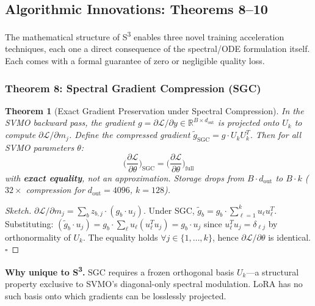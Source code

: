 \documentclass[conference]{IEEEtran}
\newtheorem{theorem}{Theorem}[section]
\newcommand{\RR}{\mathbb{R}}
\begin{document}
\subsection{Algorithmic Innovations: Theorems 8--10}

The mathematical structure of S\textsuperscript{3} enables three novel training acceleration techniques, each one a direct consequence of the spectral/ODE formulation itself. Each comes with a formal guarantee of zero or negligible quality loss.

\subsubsection{Theorem 8: Spectral Gradient Compression (SGC)}

\begin{theorem}[Exact Gradient Preservation under Spectral Compression]
\label{thm:sgc}
In the SVMO backward pass, the gradient $g = \partial\mathcal{L}/\partial y \in \RR^{B \times d_{\text{out}}}$ is projected onto $U_k$ to compute $\partial\mathcal{L}/\partial m_j$. Define the compressed gradient $\tilde{g}_{\text{SGC}} = g \cdot U_k U_k^T$. Then for all SVMO parameters $\theta$:
\begin{equation}
\Big(\frac{\partial\mathcal{L}}{\partial\theta}\Big)_{\text{SGC}} = \Big(\frac{\partial\mathcal{L}}{\partial\theta}\Big)_{\text{full}}
\end{equation}
with \textbf{exact equality}, not an approximation. Storage drops from $B \cdot d_{\text{out}}$ to $B \cdot k$ ($32\times$ compression for $d_{\text{out}}=4096$, $k=128$).
\end{theorem}

\begin{proof}[Sketch]
$\partial\mathcal{L}/\partial m_j = \sum_b z_{b,j} \cdot (g_b \cdot u_j)$. Under SGC, $\tilde{g}_b = g_b \cdot \sum_{\ell=1}^k u_\ell u_\ell^T$. Substituting: $(\tilde{g}_b \cdot u_j) = g_b \cdot \sum_\ell u_\ell (u_\ell^T u_j) = g_b \cdot u_j$ since $u_\ell^T u_j = \delta_{\ell j}$ by orthonormality of $U_k$. The equality holds $\forall j \in \{1,\dots,k\}$, hence $\partial\mathcal{L}/\partial\theta$ is identical. $\square$
\end{proof}

\textbf{Why unique to S\textsuperscript{3}.} SGC requires a frozen orthogonal basis $U_k$—a structural property exclusive to SVMO's diagonal-only spectral modulation. LoRA has no such basis onto which gradients can be losslessly projected.
\end{document}

